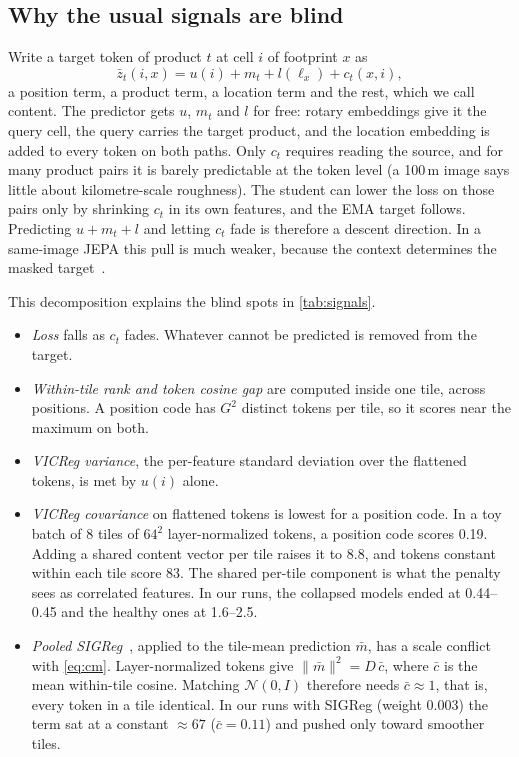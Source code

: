 \subsection{Why the usual signals are blind}

Write a target token of product $t$ at cell $i$ of footprint $x$ as
\begin{equation}
  \bar z_t(i, x) = u(i) + m_t + l(\ell_x) + c_t(x, i),
  \label{eq:decomp}
\end{equation}
a position term, a product term, a location term and the rest, which we call content. The predictor gets $u$, $m_t$ and $l$ for free: rotary embeddings give it the query cell, the query carries the target product, and the location embedding is added to every token on both paths. Only $c_t$ requires reading the source, and for many product pairs it is barely predictable at the token level (a 100\,m image says little about kilometre-scale roughness). The student can lower the loss on those pairs only by shrinking $c_t$ in its own features, and the EMA target follows. Predicting $u{+}m_t{+}l$ and letting $c_t$ fade is therefore a descent direction. In a same-image JEPA this pull is much weaker, because the context determines the masked target~\cite{assran2023self,bardes2024revisiting}.

This decomposition explains the blind spots in \cref{tab:signals}.
\begin{itemize}[leftmargin=*,itemsep=1pt,topsep=2pt]
  \item \emph{Loss} falls as $c_t$ fades. Whatever cannot be predicted is removed from the target.
  \item \emph{Within-tile rank and token cosine gap} are computed inside one tile, across positions. A position code has $G^2$ distinct tokens per tile, so it scores near the maximum on both.
  \item \emph{VICReg variance}, the per-feature standard deviation over the flattened tokens, is met by $u(i)$ alone.
  \item \emph{VICReg covariance} on flattened tokens is lowest for a position code. In a toy batch of 8 tiles of $64^2$ layer-normalized tokens, a position code scores 0.19. Adding a shared content vector per tile raises it to 8.8, and tokens constant within each tile score 83. The shared per-tile component is what the penalty sees as correlated features. In our runs, the collapsed models ended at 0.44--0.45 and the healthy ones at 1.6--2.5.
  \item \emph{Pooled SIGReg}~\cite{balestriero2025lejepa}, applied to the tile-mean prediction $\bar m$, has a scale conflict with \cref{eq:cm}. Layer-normalized tokens give $\|\bar m\|^2 = D\,\bar c$, where $\bar c$ is the mean within-tile cosine. Matching $\mathcal{N}(0, I)$ therefore needs $\bar c \approx 1$, that is, every token in a tile identical. In our runs with SIGReg (weight 0.003) the term sat at a constant ${\approx}67$ ($\bar c{=}0.11$) and pushed only toward smoother tiles.
\end{itemize}

